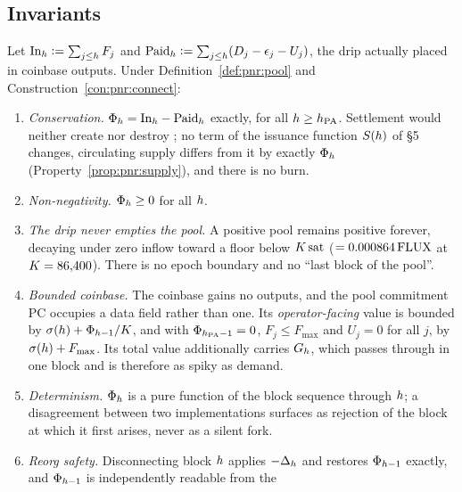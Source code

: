 \subsection{Invariants}
\label{sec:pnr:invariants}

\begin{property}
\label{prop:pnr:invariants}
Let $\mathrm{In}_{h} \vcentcolon= \sum_{j \le h}F_j$ and
$\mathrm{Paid}_{h} \vcentcolon= \sum_{j \le h}(D_j - \epsilon_j - U_j)$, the drip actually placed in
coinbase outputs. Under Definition~\ref{def:pnr:pool} and Construction~\ref{con:pnr:connect}:
\begin{enumerate}
  \item[\textbf{I1}] \emph{Conservation.} $\Phi_{h} = \mathrm{In}_{h} - \mathrm{Paid}_{h}$
    exactly, for all $h \ge h_{\mathrm{PA}}$. Settlement would neither create nor destroy \flux; no term of
    the issuance function $S(h)$ of \S5 changes, circulating supply differs from it by
    exactly $\Phi_{h}$ (Property~\ref{prop:pnr:supply}), and there is no burn.
  \item[\textbf{I2}] \emph{Non-negativity.} $\Phi_{h} \ge 0$ for all $h$.
  \item[\textbf{I3}] \emph{The drip never empties the pool.} A positive pool remains positive
    forever, decaying under zero inflow toward a floor below $K\,\mathrm{sat}$
    ($= 0.000864\,\mathrm{FLUX}$ at $K = 86{,}400$). There is no epoch boundary and no ``last block of the
    pool''.
  \item[\textbf{I4}] \emph{Bounded coinbase.} The coinbase gains no outputs, and the pool commitment
    PC occupies a data field rather than one. Its \emph{operator-facing} value is bounded by
    $\sigma(h) + \Phi_{h-1}/K$, and with $\Phi_{h_{\mathrm{PA}}-1} = 0$, $F_j \le F_{\max}$ and
    $U_j = 0$ for all $j$, by $\sigma(h) + F_{\max}$. Its total value additionally carries $G_{h}$,
    which passes through in one block and is therefore as spiky as demand.
  \item[\textbf{I5}] \emph{Determinism.} $\Phi_{h}$ is a pure function of the block sequence
    through $h$; a disagreement between two implementations surfaces as rejection of the block at
    which it first arises, never as a silent fork.
  \item[\textbf{I6}] \emph{Reorg safety.} Disconnecting block $h$ applies $-\Delta_{h}$ and
    restores $\Phi_{h-1}$ exactly, and $\Phi_{h-1}$ is independently readable from the

\end{enumerate}
\end{property}
